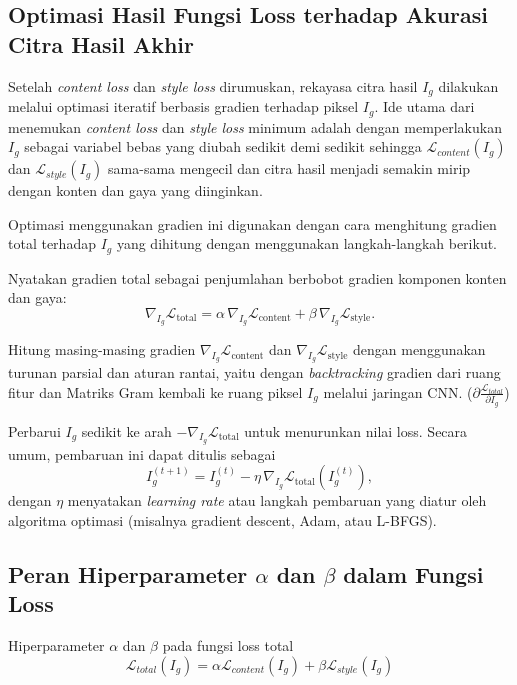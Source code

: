 \subsection{Optimasi Hasil Fungsi Loss terhadap Akurasi Citra Hasil Akhir}
Setelah \textit{content loss} dan \textit{style loss} dirumuskan, rekayasa citra hasil $I_g$ dilakukan melalui optimasi iteratif berbasis gradien terhadap piksel $I_g$. Ide utama dari menemukan \textit{content loss} dan \textit{style loss} minimum adalah dengan memperlakukan $I_g$ sebagai variabel bebas yang diubah sedikit demi sedikit sehingga $\mathcal{L}_{content}(I_g)$ dan $\mathcal{L}_{style}(I_g)$ sama-sama mengecil dan citra hasil menjadi semakin mirip dengan konten dan gaya yang diinginkan.

Optimasi menggunakan gradien ini digunakan dengan cara menghitung gradien total terhadap $I_g$ yang dihitung dengan menggunakan langkah-langkah berikut.
\begin{IEEEenumerate}
    \item Nyatakan gradien total sebagai penjumlahan berbobot gradien komponen konten dan gaya:
    $$
      \nabla_{I_g} \mathcal{L}_{\text{total}}
        = \alpha \, \nabla_{I_g} \mathcal{L}_{\text{content}}
        + \beta \, \nabla_{I_g} \mathcal{L}_{\text{style}}.
    $$
\item Hitung masing-masing gradien $\nabla_{I_g} \mathcal{L}_{\text{content}}$ dan $\nabla_{I_g} \mathcal{L}_{\text{style}}$ dengan menggunakan turunan parsial dan aturan rantai, yaitu dengan \textit{backtracking} gradien dari ruang fitur dan Matriks Gram kembali ke ruang piksel $I_g$ melalui jaringan CNN. ($\partial \frac{\mathcal{L}_{total}}{\partial I_g}$)
    \item Perbarui $I_g$ sedikit ke arah $-\nabla_{I_g} \mathcal{L}_{\text{total}}$ untuk menurunkan nilai loss. Secara umum, pembaruan ini dapat ditulis sebagai
    $$
        I_g^{(t+1)} = I_g^{(t)} - \eta \, \nabla_{I_g} \mathcal{L}_{\text{total}}(I_g^{(t)}),
    $$
    dengan $\eta$ menyatakan \emph{learning rate} atau langkah pembaruan yang diatur oleh algoritma optimasi (misalnya gradient descent, Adam, atau L-BFGS).
\end{IEEEenumerate}

\subsection{Peran Hiperparameter $\alpha$ dan $\beta$ dalam Fungsi Loss}

Hiperparameter $\alpha$ dan $\beta$ pada fungsi loss total
$$
\mathcal{L}_{total}(I_g) = \alpha \mathcal{L}_{content}(I_g) + \beta \mathcal{L}_{style}(I_g)
$$

